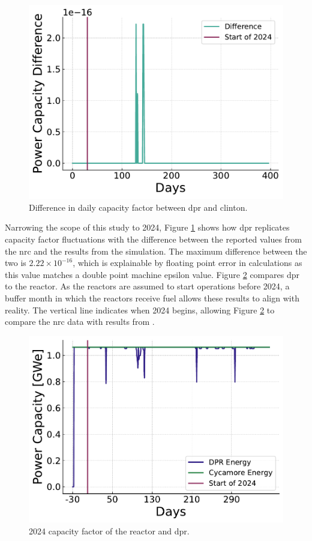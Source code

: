 \begin{figure}[H]
  \centering
  \includegraphics[width=0.7\linewidth]{images/power_reactor/dpr_diff.pdf}
  \caption{Difference in daily capacity factor between \gls{dpr} and \gls{clinton}.}
  \label{fig:dpr_clinton_diff}
\end{figure}


Narrowing the scope of this study to 2024, Figure \ref{fig:dpr_clinton_diff} shows how \gls{dpr} replicates capacity factor fluctuations with the difference between the reported values from the \gls{nrc} \cite{nrc_power_2025} and the results from the \cyclus simulation. The maximum difference between the two is $2.22 \times 10^{-16}$, which is explainable by floating point error in calculations as this value matches a double point machine epsilon value. Figure \ref{fig:dpr_cycamore_power} compares \gls{dpr} to the \cycamore reactor. As the reactors are assumed to start operations before 2024, a buffer month in which the reactors receive fuel allows these results to align with reality. The vertical line indicates when 2024 begins, allowing Figure \ref{fig:dpr_cycamore_power} to compare the \gls{nrc} data with results from \cyclus.


\begin{figure}[H]
  \centering
  \includegraphics[width=0.7\linewidth]{images/power_reactor/dpr_cycamore_energy.pdf}
  \caption{2024 capacity factor of the \cycamore reactor and \gls{dpr}.}
  \label{fig:dpr_cycamore_power}
\end{figure}


